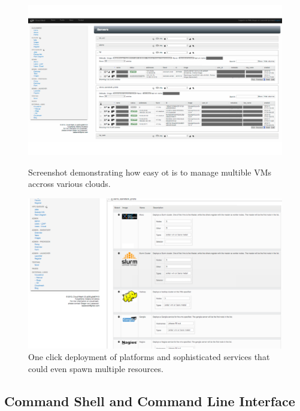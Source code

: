 \documentclass[graybox]{svmult}
\begin{document}
\begin{figure}[htb]
  \centering
    \includegraphics[width=.9\textwidth]{images/instances.pdf}
  \caption{Screenshot demonstrating how easy ot is to manage multible VMs accross various clouds.}\label{F:instances}
  \centering
    \includegraphics[width=.9\textwidth]{images/oneclick.pdf}
  \caption{One click deployment of platforms and sophisticated
    services that could even spawn multiple resources.}\label{F:oneclick}
\end{figure}

\subsection{Command Shell and Command Line Interface}
\end{document}

